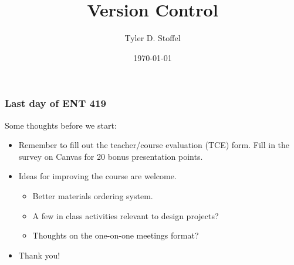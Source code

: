 \documentclass[
8pt,
]{beamer}
\title{Version Control}
\date{\today}
\author{Tyler D. Stoffel}
\institute{ENT 419: Senior Project I}
\begin{document}
\maketitle
%
\begin{frame}
  \frametitle{Last day of ENT 419}
  Some thoughts before we start:
  \begin{itemize}
    \item<2-> Remember to fill out the teacher/course evaluation (TCE) form. Fill in the survey on Canvas for 20 bonus presentation points.
    \item<3-> Ideas for improving the course are welcome.
          \begin{itemize}
            \item Better materials ordering system.
            \item A few in class activities relevant to design projects?
            \item Thoughts on the one-on-one meetings format?
          \end{itemize}
    \item<4-> Thank you!
  \end{itemize}
\end{frame}
%
\end{document}
